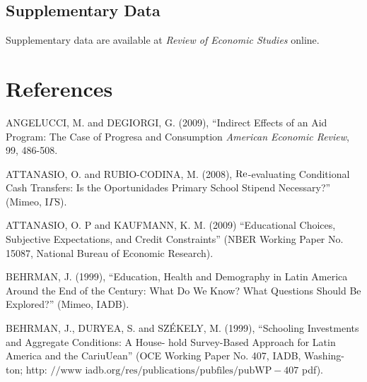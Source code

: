 \documentclass{handoutForSolutions}
\begin{document}
\subsection*{Supplementary Data}
Supplementary data are available at {\it Review of Economic Studies} online.







































\newpage
\section*{References}
ANGELUCCI, M. and DEGIORGI, G. (2009), ``Indirect Effects of an Aid Program: The Case of Progresa and Consumption {\it American Economic Review}, 99, 486-508.

ATTANASIO, O. and RUBIO-CODINA, M. (2008), ${\rm Re}$-evaluating Conditional Cash Transfers: Is the Oportunidades Primary School Stipend Necessary?'' (Mimeo, $\mathrm{I}\Gamma \mathrm{S}$).

ATTANASIO, O. $\mathrm{P}$ and KAUFMANN, K. M. (2009) ``Educational Choices, Subjective Expectations, and Credit Constraints'' (NBER Working Paper No. 15087, National Bureau of Economic Research).

BEHRMAN, J. (1999), ``Education, Health and Demography in Latin America Around the End of the Century: What Do We Know? What Questions Should Be Explored?'' (Mimeo, IADB).

BEHRMAN, J., DURYEA, S. and SZ\'{E}KELY, M. (1999), ``Schooling Investments and Aggregate Conditions: A House- hold Survey-Based Approach for Latin America and the CariuUean'' (OCE Working Paper No. 407, IADB, Washing- ton; http: $//\mathrm{w}\mathrm{w}\mathrm{w}$ iadb.$\mathrm{o}\mathrm{r}\mathrm{g}/\mathrm{r}\mathrm{e}\mathrm{s}/\mathrm{p}\mathrm{u}\mathrm{b}\mathrm{l}\mathrm{i}\mathrm{c}\mathrm{a}\mathrm{t}\mathrm{i}\mathrm{o}\mathrm{n}\mathrm{s}/\mathrm{p}\mathrm{u}\mathrm{b}\mathrm{f}\mathrm{i}\mathrm{l}\mathrm{e}\mathrm{s}/\mathrm{p}\mathrm{u}\mathrm{b}\mathrm{W}\mathrm{P}-407$ pdf).
\end{document}
